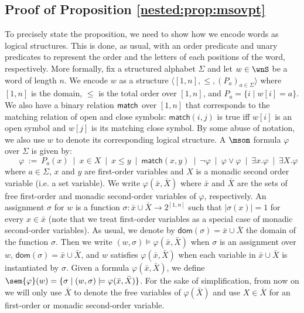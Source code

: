 
\subsection{Proof of Proposition \ref{nested:prop:msovpt}}

To precisely state the proposition, we need to show how we encode words as logical structures. 
This is done, as usual, with an order predicate and unary predicates to represent the order and the letters of each positions of the word, respectively. 
More formally, fix a structured alphabet $\Sigma$ and let $w \in \wnS$ be a word of length $n$. 
We encode $w$ as a structure $\langle [1,n], \leq, (P_a)_{a\in\Sigma}\rangle$ where $[1,n]$ is the domain, $\leq$ 
is the total order over $[1, n]$, and $P_a = \{i \mid w[i] = a\}$. 
We also have a binary relation $\sf{match}$ over $[1,n]$ that corresponds to the matching relation of open and close symbols: $\textsf{match}(i, j)$ is true iff $w[i]$ is an open symbol and $w[j]$ is its matching close symbol.
By some abuse of notation, we also use $w$ to denote its corresponding logical structure. A $\msom$ formula $\varphi$ over $\Sigma$ is given by:
\[
\ \ \ \ \ \ \, \varphi \ :=\ P_a(x) \ \mid\  x \in X \ \mid \ x \leq y \ \mid \ \textsf{match}(x, y) \ \mid \ \neg \varphi \ \mid \ \varphi \vee \varphi \ \mid \ \exists x.\varphi \ \mid \ \exists X.\varphi 
\]
where $a\in\Sigma$, $x$ and $y$ are first-order variables and $X$ is a monadic second order variable (i.e. a set variable). 
We write $\varphi(\bar{x}, \bar{X})$ where $\bar{x}$ and $\bar{X}$ are the sets of free first-order and monadic second-order variables of $\varphi$, respectively. 
An assignment $\sigma$ for $w$ is a function $\sigma\colon \bar{x}\cup \bar{X}\to 2^{[1,n]}$ such that $|\sigma(x)| = 1$ for every $x \in \bar{x}$ (note that we treat first-order variables as a special case of monadic second-order variables). 
As usual, we denote by $\textsf{dom}(\sigma) = \bar{x}\cup \bar{X}$ the domain of the function $\sigma$. 
Then we write $(w, \sigma) \models \varphi(\bar{x}, \bar{X})$ when $\sigma$ is an assignment over $w$, $\textsf{dom}(\sigma) = \bar{x}\cup \bar{X}$, and $w$ satisfies $\varphi(\bar{x}, \bar{X})$ when each variable in $\bar{x}\cup \bar{X}$ is instantiated by $\sigma$. 
Given a formula $\varphi(\bar{x},\bar{X})$, we define $\sem{\varphi}(w) = \{\sigma \mid (w, \sigma) \models \varphi(\bar{x},\bar{X})\}$. 
For the sake of simplification, from now on we will only use $\bar{X}$ to denote the free variables of $\varphi(\bar{X})$ and use $X \in \bar{X}$ for an first-order or monadic second-order variable.

